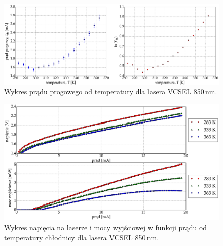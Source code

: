 \begin{figure}
\center
  \includegraphics[scale=0.30]{plot_vcsel_850/plot_temp_i_th_log_lin.eps}
  \caption{Wykres prądu progowego od temperatury dla lasera VCSEL 850\,nm.}
  \label{fig:plot_temp_i_th_log_lin_vcsel850}
\end{figure}
\begin{figure}
\center
  \includegraphics[scale=0.30]{plot_vcsel_850/plot_power_voltage.eps}
  \caption{Wykres napięcia na laserze i mocy wyjściowej w funkcji prądu od temperatury chłodnicy dla lasera VCSEL 850\,nm.}
  \label{fig:plot_power_voltage_vcsel850}
\end{figure}
